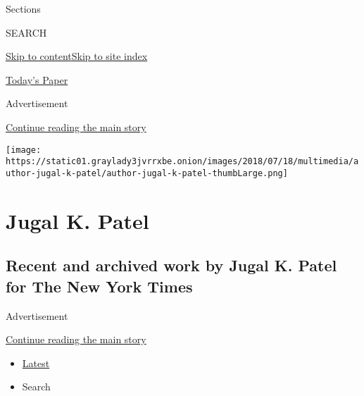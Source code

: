 Sections

SEARCH

\protect\hyperlink{site-content}{Skip to
content}\protect\hyperlink{site-index}{Skip to site index}

\href{https://myaccount.nytimes3xbfgragh.onion/auth/login?response_type=cookie\&client_id=vi}{}

\href{https://www.nytimes3xbfgragh.onion/section/todayspaper}{Today's
Paper}

Advertisement

\protect\hyperlink{after-top}{Continue reading the main story}

\texttt{[image: https://static01.graylady3jvrrxbe.onion/images/2018/07/18/multimedia/author-jugal-k-patel/author-jugal-k-patel-thumbLarge.png]}

\hypertarget{jugal-k-patel}{%
\section{Jugal K. Patel}\label{jugal-k-patel}}

\hypertarget{recent-and-archived-work-by-jugal-k-patel-for-the-new-york-times}{%
\subsection{Recent and archived work by Jugal K. Patel for The New York
Times}\label{recent-and-archived-work-by-jugal-k-patel-for-the-new-york-times}}

Advertisement

\protect\hyperlink{after-mid1}{Continue reading the main story}

\begin{itemize}
\tightlist
\item
  \protect\hyperlink{stream-panel}{Latest}
\item
  Search
\end{itemize}

